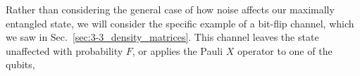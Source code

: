 Rather than considering the general case of how noise affects our maximally entangled state, we will consider the specific example of a bit-flip channel, which we saw in Sec.~\ref{sec:3-3_density_matrices}.
This channel leaves the state unaffected with probability $F$, or applies the Pauli $X$ operator to one of the qubits,
